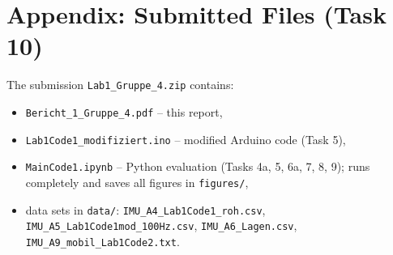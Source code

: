 \documentclass[a4paper,oneside,10pt]{article}
\begin{document}
\appendix
\section{Appendix: Submitted Files (Task 10)}
\label{sec:anhang}
The submission \texttt{Lab1\_Gruppe\_4.zip} contains:
\begin{itemize}
  \item \texttt{Bericht\_1\_Gruppe\_4.pdf} -- this report,
  \item \texttt{Lab1Code1\_modifiziert.ino} -- modified Arduino code (Task 5),
  \item \texttt{MainCode1.ipynb} -- Python evaluation (Tasks 4a, 5, 6a, 7, 8, 9); runs completely and saves all figures in \texttt{figures/},
  \item data sets in \texttt{data/}: \texttt{IMU\_A4\_Lab1Code1\_roh.csv}, \texttt{IMU\_A5\_Lab1Code1mod\_100Hz.csv}, \texttt{IMU\_A6\_Lagen.csv}, \texttt{IMU\_A9\_mobil\_Lab1Code2.txt}.
\end{itemize}
\end{document}
